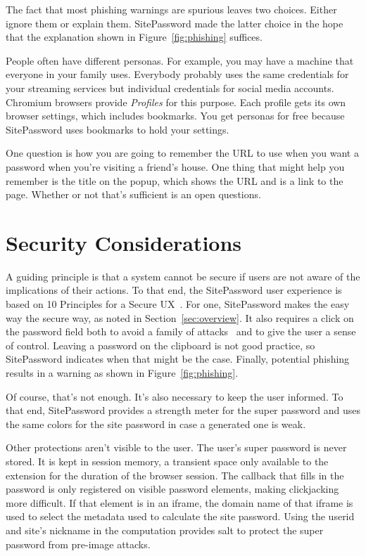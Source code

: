 The fact that most phishing warnings are spurious leaves two choices.  Either ignore them or explain them.  SitePassword made the latter choice in the hope that the explanation shown in Figure~\ref{fig:phishing} suffices.  

People often have different personas.  For example, you may have a machine that everyone in your family uses.  Everybody probably uses the same credentials for your streaming services but individual credentials for social media accounts.  Chromium browsers provide {\em Profiles} for this purpose.  Each profile gets its own browser settings, which includes bookmarks.  You get personas for free because SitePassword uses bookmarks to hold your settings.

One question is how you are going to remember the URL to use when you want a password when you're visiting a friend's house.  One thing that might help you remember is the title on the popup, which shows the URL and is a link to the page.  Whether or not that's sufficient is an open questions.

\section{Security Considerations}\label{sec:security}

A guiding principle is that a system cannot be secure if users are not aware of the implications of their actions.  To that end, the SitePassword user experience is based on 10 Principles for a Secure UX~\cite{10principles}.  For one, SitePassword makes the easy way the secure way, as noted in Section~\ref{sec:overview}.  It also requires a click on the password field both to avoid a family of attacks~\cite{silver2014password} and to give the user a sense of control.  Leaving a password on the clipboard is not good practice, so SitePassword indicates when that might be the case.  Finally, potential phishing results in a warning as shown in Figure~\ref{fig:phishing}.

Of course, that's not enough.  It's also necessary to keep the user informed.  To that end, SitePassword provides a strength meter for the super password and uses the same colors for the site password in case a generated one is weak.

Other protections aren't visible to the user.  The user's super password is never stored.  It is kept in session memory, a transient space only available to the extension for the duration of the browser session.  The callback that fills in the password is only registered on visible password elements, making clickjacking more difficult.  If that element is in an iframe, the domain name of that iframe is used to select the metadata used to calculate the site password.  Using the userid and site's nickname in the computation provides salt to protect the super password from pre-image attacks.

